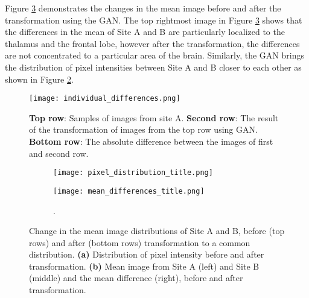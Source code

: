 Figure \ref{fig:mean_image} demonstrates the changes in the mean image before and after the transformation using the GAN. The top rightmost image in Figure \ref{fig:mean_image} shows that the differences in the mean of Site A and B are particularly localized to the thalamus and the frontal lobe, however after the transformation, the differences are not concentrated to a particular area of the brain. Similarly, the GAN brings the distribution of pixel intensities between Site A and B closer to each other as shown in Figure \ref{fig:pixel_distri}.

\begin{figure}[!ht]
\begin{center}
 \texttt{[image: individual\_differences.png]}
    \end{center}
  \caption{\textbf{Top row}: Samples of images from site A. \textbf{Second row}: The result of the transformation of images from the top row using GAN. \textbf{Bottom row}: The absolute difference between the images of first and second row.}
  \label{fig:transformation}
\end{figure}

\begin{figure}[!ht]
\begin{center}
\begin{subfigure}[t]{0.43\linewidth}
\centering
 \texttt{[image: pixel\_distribution\_title.png]}
 \caption{}
 \label{fig:pixel_distri}
 \end{subfigure}
 \hspace{0.1cm} %
\begin{subfigure}[t]{0.52\linewidth}

\centering
 \texttt{[image: mean\_differences\_title.png]}
 \caption{}.

 \end{subfigure}
    \end{center}
  \caption{Change in the mean image distributions of Site A and B, before (top rows) and after (bottom rows) transformation to a common distribution. \textbf{(a)} Distribution of pixel intensity before and after transformation. \textbf{(b)} Mean image from Site A (left) and Site B (middle) and the mean difference (right), before and after transformation.}
  \label{fig:mean_image}
\end{figure}


